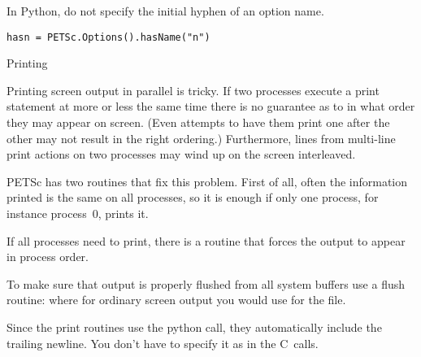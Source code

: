 \begin{pythonnote}
  In Python, do not specify the initial hyphen of an option name.
\begin{verbatim}
hasn = PETSc.Options().hasName("n")
\end{verbatim}
\end{pythonnote}

 {Printing}

Printing screen output in parallel is tricky. If two processes execute
a print statement at more or less the same time there is no guarantee
as to in what order they may appear on screen. (Even attempts to have
them print one after the other may not result in the right ordering.)
Furthermore, lines from multi-line print actions on two processes may
wind up on the screen interleaved.

PETSc has two routines that fix this problem. First of all, often the
information printed is the same on all processes, so it is enough if
only one process, for instance process~0, prints it.
%

If all processes need to print, there is a routine that forces the
output to appear in process order.
%

To make sure that output is properly flushed from all system buffers
use a flush routine:
%
%
where for ordinary screen output you would use  for the file.

\begin{pythonnote}
  Since the print routines use the python  call, they
  automatically include the trailing newline. You don't have to
  specify it as in the C~calls.
\end{pythonnote}

